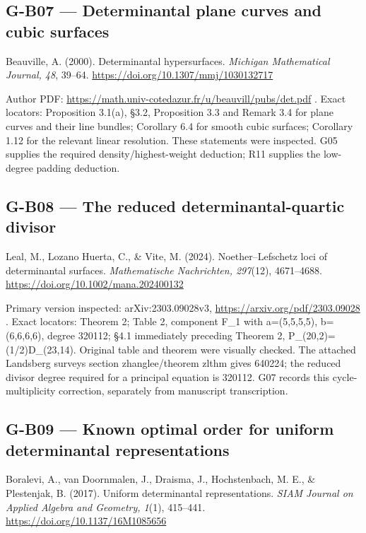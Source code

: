 \documentclass[11pt,a4paper]{article}
\theoremstyle{definition}\newtheorem{definition}{Definition}
\begin{document}
\subsection{G-B07 --- Determinantal plane curves and cubic
surfaces}\label{g-b07--determinantal-plane-curves-and-cubic-surfaces}

Beauville, A. (2000). Determinantal hypersurfaces. \emph{Michigan
Mathematical Journal, 48}, 39--64.
\url{https://doi.org/10.1307/mmj/1030132717}

Author PDF: \url{https://math.univ-cotedazur.fr/u/beauvill/pubs/det.pdf}
. Exact locators: Proposition 3.1(a), §3.2, Proposition 3.3 and Remark
3.4 for plane curves and their line bundles; Corollary 6.4 for smooth
cubic surfaces; Corollary 1.12 for the relevant linear resolution. These
statements were inspected. G05 supplies the required
density/highest-weight deduction; R11 supplies the low-degree padding
deduction.

\subsection{G-B08 --- The reduced determinantal-quartic
divisor}\label{g-b08--the-reduced-determinantal-quartic-divisor}

Leal, M., Lozano Huerta, C., \& Vite, M. (2024). Noether--Lefschetz loci
of determinantal surfaces. \emph{Mathematische Nachrichten, 297}(12),
4671--4688. \url{https://doi.org/10.1002/mana.202400132}

Primary version inspected: arXiv:2303.09028v3,
\url{https://arxiv.org/pdf/2303.09028} . Exact locators: Theorem 2;
Table 2, component F\_1 with a=(5,5,5,5), b=(6,6,6,6), degree 320112;
§4.1 immediately preceding Theorem 2, P\_(20,2)=(1/2)D\_(23,14).
Original table and theorem were visually checked. The attached Landsberg
survey\textquotesingle s section zhanglee/theorem zlthm gives 640224;
the reduced divisor degree required for a principal equation is 320112.
G07 records this cycle-multiplicity correction, separately from
manuscript transcription.

\subsection{G-B09 --- Known optimal order for uniform determinantal
representations}\label{g-b09--known-optimal-order-for-uniform-determinantal-representations}

Boralevi, A., van Doornmalen, J., Draisma, J., Hochstenbach, M. E., \&
Plestenjak, B. (2017). Uniform determinantal representations. \emph{SIAM
Journal on Applied Algebra and Geometry, 1}(1), 415--441.
\url{https://doi.org/10.1137/16M1085656}
\end{document}

